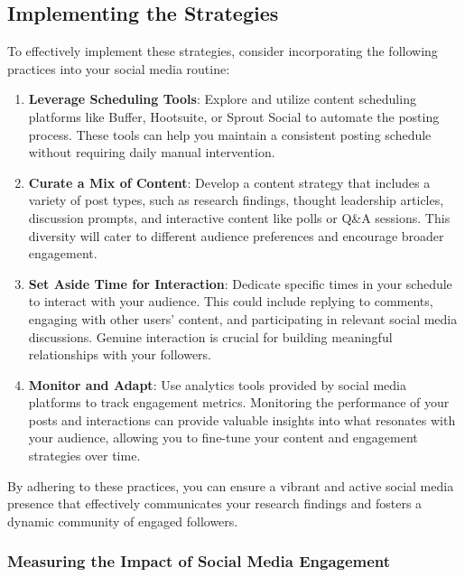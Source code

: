 \documentclass[
]{book}
\begin{document}
\hypertarget{implementing-the-strategies-1}{%
\subsection{Implementing the Strategies}\label{implementing-the-strategies-1}}

To effectively implement these strategies, consider incorporating the following practices into your social media routine:

\begin{enumerate}
\def\labelenumi{\arabic{enumi}.}
\item
  \textbf{Leverage Scheduling Tools}: Explore and utilize content scheduling platforms like Buffer, Hootsuite, or Sprout Social to automate the posting process. These tools can help you maintain a consistent posting schedule without requiring daily manual intervention.
\item
  \textbf{Curate a Mix of Content}: Develop a content strategy that includes a variety of post types, such as research findings, thought leadership articles, discussion prompts, and interactive content like polls or Q\&A sessions. This diversity will cater to different audience preferences and encourage broader engagement.
\item
  \textbf{Set Aside Time for Interaction}: Dedicate specific times in your schedule to interact with your audience. This could include replying to comments, engaging with other users' content, and participating in relevant social media discussions. Genuine interaction is crucial for building meaningful relationships with your followers.
\item
  \textbf{Monitor and Adapt}: Use analytics tools provided by social media platforms to track engagement metrics. Monitoring the performance of your posts and interactions can provide valuable insights into what resonates with your audience, allowing you to fine-tune your content and engagement strategies over time.
\end{enumerate}

By adhering to these practices, you can ensure a vibrant and active social media presence that effectively communicates your research findings and fosters a dynamic community of engaged followers.

\hypertarget{measuring-the-impact-of-social-media-engagement}{%
\subsubsection*{Measuring the Impact of Social Media Engagement}\label{measuring-the-impact-of-social-media-engagement}}
\end{document}
